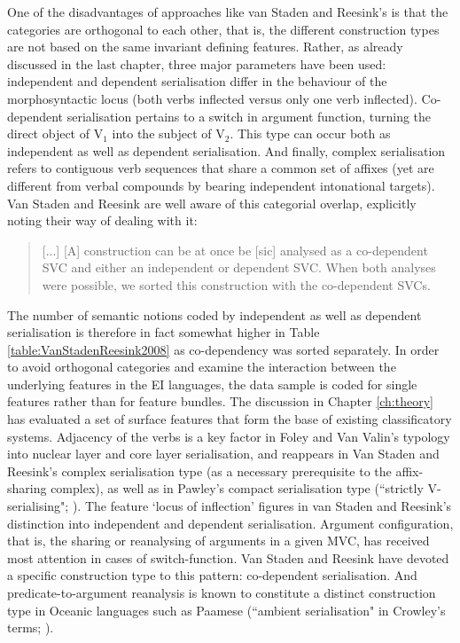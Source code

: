 One of the disadvantages of approaches like van Staden and Reesink's is that the categories are orthogonal to each other, that is, the different construction types are not based on the same invariant defining features. Rather, as already discussed in the last chapter, three major parameters have been used: independent and dependent serialisation differ in the behaviour of the morphosyntactic locus (both verbs inflected versus only one verb inflected). Co-dependent serialisation pertains to a switch in argument function, turning the direct object of V$_1$ into the subject of V$_2$. This type can occur both as independent as well as dependent serialisation. And finally, complex serialisation refers to contiguous verb sequences that share a common set of affixes (yet are different from verbal compounds by bearing independent intonational targets). Van Staden and Reesink are well aware of this categorial overlap, explicitly noting their way of dealing with it: 

\begin{quote}
[...] [A] construction can be at once be [sic] analysed as a co-dependent SVC and either an independent or dependent SVC. When both analyses were possible, we sorted this construction with the co-dependent SVCs. \citep[47]{vanstaden2008serial}
\end{quote}

The number of semantic notions coded by independent as well as dependent serialisation is therefore in fact somewhat higher in Table \ref{table:VanStadenReesink2008} as co-dependency was sorted separately. In order to avoid orthogonal categories and examine the interaction between the underlying features in the EI languages, the data sample is coded for single features rather than for feature bundles. The discussion in Chapter \ref{ch:theory} has evaluated a set of surface features that form the base of existing classificatory systems. Adjacency of the verbs is a key factor in Foley and Van Valin's typology into nuclear layer and core layer serialisation, and reappears in Van Staden and Reesink's complex serialisation type (as a necessary prerequisite to the affix-sharing complex), as well as in Pawley's compact serialisation type (``strictly V-serialising"; \citealt[172]{pawley2008serial}). The feature `locus of inflection' figures in van Staden and Reesink's distinction into independent and dependent serialisation. Argument configuration, that is, the sharing or reanalysing of arguments in a given MVC, has received most attention in cases of switch-function. Van Staden and Reesink have devoted a specific construction type to this pattern: co-dependent serialisation. And predicate-to-argument reanalysis is known to constitute a distinct construction type in Oceanic languages such as Paamese (``ambient serialisation" in Crowley's terms; \citealt{crowley2002serial}).

